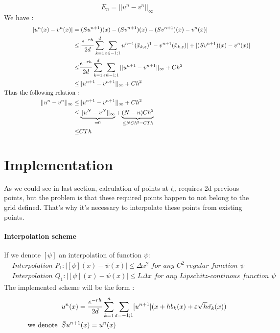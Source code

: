 \documentclass[a4paper,10pt]{article}
\begin{document}
\begin{equation}
 E_n=||u^n-v^n||_\infty
\end{equation}
We have : 
\begin{align*}
|u^n(x)-v^n(x)|=&|(Su^{n+1})(x)-(Sv^{n+1})(x)+(Sv^{n+1})(x)-v^n(x)| \\
			   \leq & |\frac{e^{-rh}}{2d}\sum_{k=1}^d \sum_{\varepsilon \in {-1;1}} u^{n+1}(\bar{x}_{k,\varepsilon})\footnotemark-v^{n+1}(\bar{x}_{k,\varepsilon}) |+|(Sv^{n+1})(x)-v^n(x)|\\
			   \leq & \frac{e^{-rh}}{2d}\sum_{k=1}^d \sum_{\varepsilon \in {-1;1}}||u^{n+1}-v^{n+1}||_\infty + Ch^2\\ 
			   \leq & ||u^{n+1}-v^{n+1}||_\infty+Ch^2 \\
\text{Thus the following relation :} \\
||u^{n}-v^{n}||_\infty \leq&||u^{n+1}-v^{n+1}||_\infty+Ch^2\\
\leq&\underbrace{||u^{N}-v^{N}||_\infty}_{=0} + \underbrace{(N-n)Ch^2}_{\leq NCh^2 = CTh}\\
\leq& CTh \\
\end{align*}

\section{Implementation}
As we could see in last section, calculation of points at $t_n$ requires 2d previous points, but the problem is that these required points happen to not belong to the grid defined. That's why it's necessary to interpolate these points from existing points.

\paragraph{Interpolation scheme}
If we denote $[\psi]$ an interpolation of function $\psi$: 
\begin{align*}
&\textit{Interpolation } P_1: |[\psi ](x)-\psi(x)|\leq\Delta x^2  \textit{ for any $C^2$ regular function $\psi$}\\
& \textit{Interpolation } Q_1: |[\psi ](x)-\psi(x)|\leq L\Delta x  \textit{ for any Lipschitz-continous function $\psi$}
\end{align*}
The implemented scheme will be the form :
\begin{align*}
& u^n(x)=\frac{e^{-rh}}{2d}\sum_{k=1}^d \sum_{\varepsilon={-1;1}}[u^{n+1}](x + hb_k(x) +\varepsilon \sqrt{h}  \bar{\sigma_k}(x))\\
\text{we denote} \hspace{0.2cm} &\bar{S}u^{n+1}(x)=u^n(x)
\end{align*}
\end{document}
